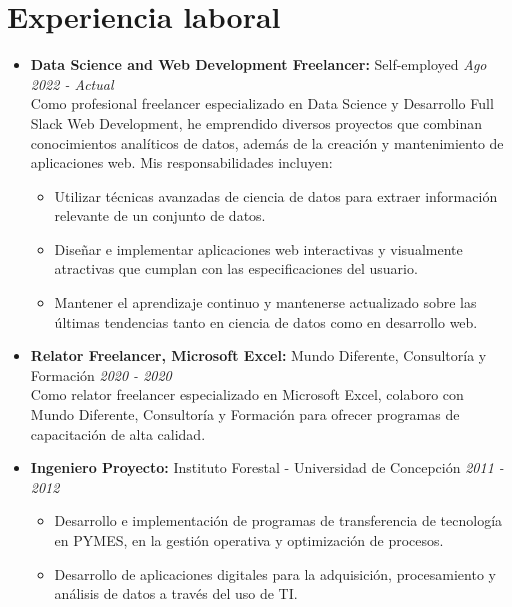 \documentclass[a4paper,10pt]{article}
\begin{document}
	
	\section*{Experiencia laboral}
		\begin{itemize}[left=0pt]
			\item \textbf{\large Data Science and Web Development Freelancer:} Self-employed \hfill \textit{Ago 2022 - Actual} \\
			\small Como profesional freelancer especializado en Data Science y Desarrollo Full Slack Web Development, he emprendido diversos proyectos que combinan conocimientos analíticos de datos, además de la creación y mantenimiento de aplicaciones web. Mis responsabilidades incluyen:
			\begin{itemize}[left=10pt]
				\item Utilizar técnicas avanzadas de ciencia de datos para extraer información relevante de un conjunto de datos.
				\item Diseñar e implementar aplicaciones web interactivas y visualmente atractivas que cumplan con las especificaciones del usuario.
				\item Mantener el aprendizaje continuo y mantenerse actualizado sobre las últimas tendencias tanto en ciencia de datos como en desarrollo web.
			\end{itemize}
			
			\item \textbf{\large Relator Freelancer, Microsoft Excel:} Mundo Diferente, Consultoría y Formación \hfill \textit{2020 - 2020} \\
			\small Como relator freelancer especializado en Microsoft Excel, colaboro con Mundo Diferente, Consultoría y Formación para ofrecer programas de capacitación de alta calidad. 
			
			\item \textbf{\large Ingeniero Proyecto:} Instituto Forestal - Universidad de Concepción \hfill \textit{2011 - 2012}
			\begin{itemize}[left=10pt, topsep=0pt]
				\item Desarrollo e implementación de programas de transferencia de tecnología en PYMES, en la gestión operativa y optimización de procesos.
				\item Desarrollo de aplicaciones digitales para la adquisición, procesamiento y análisis de datos a través del uso de TI.
			\end{itemize}
		

\end{itemize}
\end{document}
